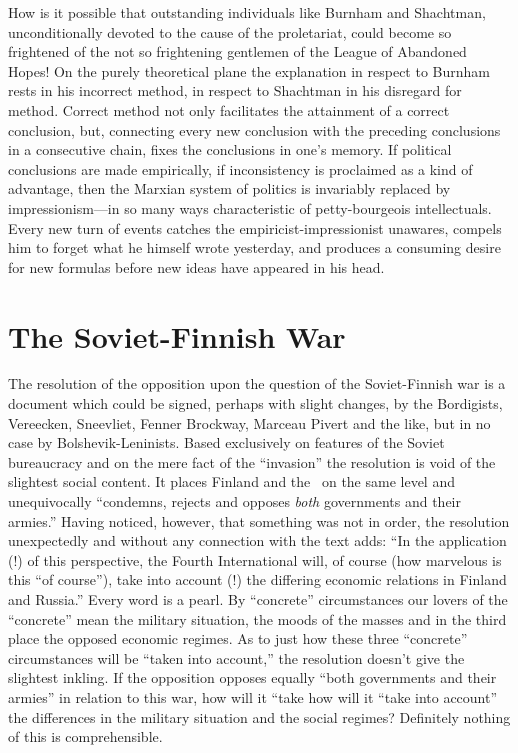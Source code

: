 How is it possible that outstanding individuals like Burnham and Shachtman, unconditionally devoted to the cause of the proletariat, could become so frightened of the not so frightening gentlemen of the League of Abandoned Hopes! On the purely theoretical plane the explanation in respect to Burnham rests in his incorrect method, in respect to Shachtman in his disregard for method. Correct method not only facilitates the attainment of a correct conclusion, but, connecting every new conclusion with the preceding conclusions in a consecutive chain, fixes the conclusions in one’s memory. If political conclusions are made empirically, if inconsistency is proclaimed as a kind of advantage, then the Marxian system of politics is invariably replaced by impressionism---in so many ways characteristic of petty-bourgeois intellectuals. Every new turn of events catches the empiricist-impressionist unawares, compels him to forget what he himself wrote yesterday, and produces a consuming desire for new formulas before new ideas have appeared in his head.

\section*{The Soviet-Finnish War}

The resolution of the opposition upon the question of the Soviet-Finnish war is a document which could be signed, perhaps with slight changes, by the Bordigists, Vereecken, Sneevliet, Fenner Brockway, Marceau Pivert and the like, but in no case by Bolshevik-Leninists. Based exclusively on features of the Soviet bureaucracy and on the mere fact of the “invasion” the resolution is void of the slightest social content. It places Finland and the \USSR\ on the same level and unequivocally “condemns, rejects and opposes \emph{both} governments and their armies.” Having noticed, however, that something was not in order, the resolution unexpectedly and without any connection with the text adds: “In the application (!) of this perspective, the Fourth International will, of course (how marvelous is this “of course”), take into account (!) the differing economic relations in Finland and Russia.” Every word is a pearl. By “concrete” circumstances our lovers of the “concrete” mean the military situation, the moods of the masses and in the third place the opposed economic regimes. As to just how these three “concrete” circumstances will be “taken into account,” the resolution doesn’t give the slightest inkling. If the opposition opposes equally “both governments and their armies” in relation to this war, how will it “take how will it “take into account” the differences in the military situation and the social regimes? Definitely nothing of this is comprehensible.

